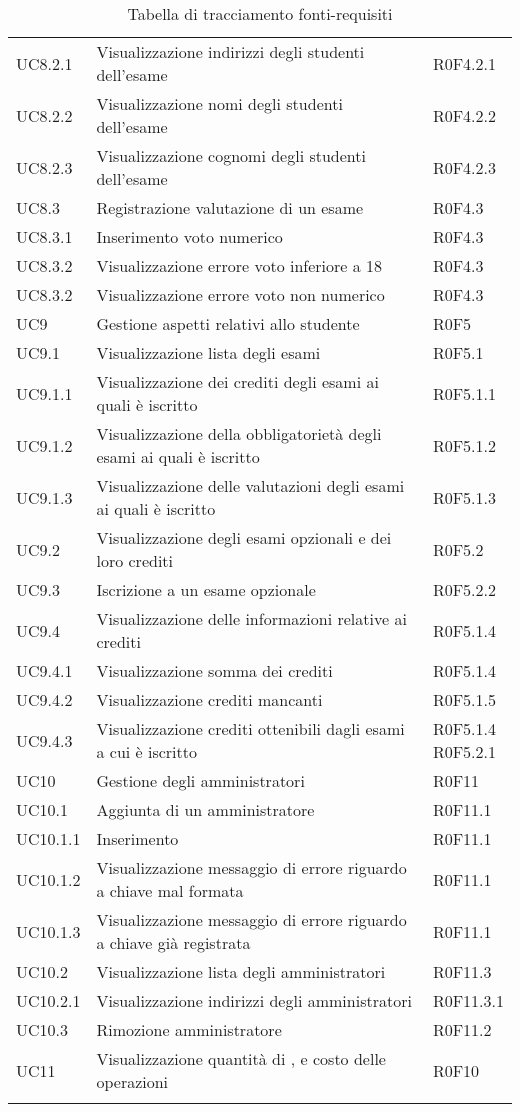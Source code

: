 \documentclass[AnalisiDeiRequisiti.tex]{subfiles}
\begin{document}
\begin{longtable}[H]{p{2cm}p{5cm}p{5cm}}
	UC8.2.1 & Visualizzazione indirizzi degli studenti dell'esame & R0F4.2.1 \\
	UC8.2.2 & Visualizzazione nomi degli studenti dell'esame & R0F4.2.2 \\
	UC8.2.3 & Visualizzazione cognomi degli studenti dell'esame & R0F4.2.3 \\
	UC8.3 & Registrazione valutazione di un esame & R0F4.3 \\
	UC8.3.1 & Inserimento voto numerico & R0F4.3 \\
	UC8.3.2 & Visualizzazione errore voto inferiore a 18 & R0F4.3 \\
	UC8.3.2 & Visualizzazione errore voto non numerico & R0F4.3 \\
	UC9 & Gestione aspetti relativi allo studente & R0F5 \\
	UC9.1 & Visualizzazione lista degli esami & R0F5.1 \\
	UC9.1.1 & Visualizzazione dei crediti degli esami ai quali è iscritto & R0F5.1.1 \\
	UC9.1.2 & Visualizzazione della obbligatorietà degli esami ai quali è iscritto & R0F5.1.2 \\
	UC9.1.3 & Visualizzazione delle valutazioni degli esami ai quali è iscritto	& R0F5.1.3 \\
	UC9.2 & Visualizzazione degli esami opzionali e dei loro crediti & R0F5.2 \\
	UC9.3 & Iscrizione a un esame opzionale & R0F5.2.2 \\
	UC9.4 & Visualizzazione delle informazioni relative ai crediti & R0F5.1.4 \\ 
	UC9.4.1 & Visualizzazione somma dei crediti & R0F5.1.4 \\ 
	UC9.4.2 & Visualizzazione crediti mancanti & R0F5.1.5 \\ 
	UC9.4.3 & Visualizzazione crediti ottenibili dagli esami a cui è iscritto &  \makecell[tl]{
		R0F5.1.4 \\ 
		R0F5.2.1 } \\
	UC10 & Gestione degli amministratori & R0F11 \\
	UC10.1 & Aggiunta di un amministratore & R0F11.1 \\
	UC10.1.1 & Inserimento \citGloss{chiave pubblica} & R0F11.1 \\
	UC10.1.2 & Visualizzazione messaggio di errore riguardo a chiave mal formata & R0F11.1 \\
	UC10.1.3 & Visualizzazione messaggio di errore riguardo a chiave già registrata & R0F11.1 \\
	UC10.2 & Visualizzazione lista degli amministratori & R0F11.3 \\
	UC10.2.1 & Visualizzazione indirizzi degli amministratori & R0F11.3.1 \\
	UC10.3 & Rimozione amministratore & R0F11.2 \\	
	UC11 & Visualizzazione quantità di \citGloss{Gas}, \citGloss{Ether} e costo delle operazioni & R0F10 \\
	\hiderowcolors
	\caption{Tabella di tracciamento fonti-requisiti}
\end{longtable}
\end{document}

